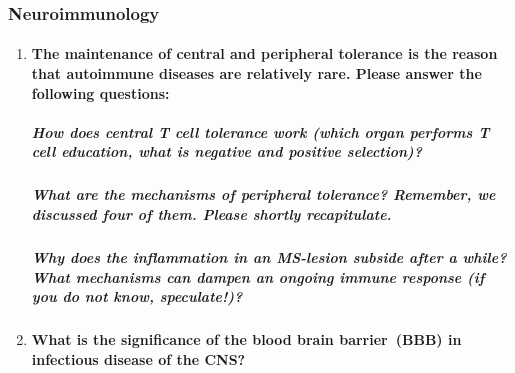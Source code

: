 \documentclass[12pt,article,oneside,a4paper]{memoir}
\begin{document}
\subsubsection{Neuroimmunology}
\begin{enumerate}
\item \paragraph{The maintenance of central and peripheral tolerance is the
reason that autoimmune diseases are relatively rare. Please answer the following
questions:}

\subparagraph{How does central T cell tolerance work (which organ performs T
cell education, what is negative and positive selection)?}

\subparagraph{What are the mechanisms of peripheral tolerance? Remember, we
discussed four of them. Please shortly recapitulate.}

\subparagraph{Why does the inflammation in an MS-lesion subside after a while?
What mechanisms can dampen an ongoing immune response (if you do not know,
speculate!)?}

\item \paragraph{What is the significance of the blood brain barrier~(BBB) in
infectious disease of the CNS?}

\end{enumerate}

\end{document}
